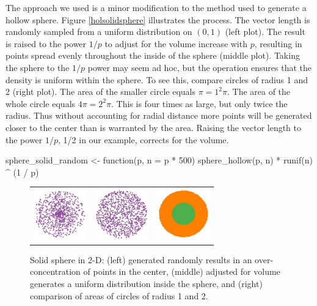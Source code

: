 The approach we used is a minor modification to the method used to
generate a hollow sphere. Figure \ref{holsolidsphere} illustrates the
process. The vector length is randomly sampled from a uniform
distribution on $(0,1)$ (left plot). The result is raised to the power
$1/p$ to adjust for the volume increase with $p$, resulting in points
spread evenly throughout the inside of the sphere (middle plot).
Taking the sphere to the $1/p$ power may seem ad hoc, but the
operation ensures that the density is uniform within the sphere. To see
this, compare circles of radius 1 and 2 (right plot).  The area of the
smaller circle equals $\pi =  1^2\pi $.  The area of the whole
circle equals $ 4 \pi = 2^2 \pi $. This is four times as large, but
only twice the radius.  Thus without accounting for radial distance
more points will be generated closer to the center than is warranted
by the area.  Raising the vector length to the power $1/p$, 1/2 in our
example, corrects for the volume.

\begin{example}
sphere_solid_random <- function(p, n = p * 500) {
  sphere_hollow(p, n) * runif(n) ^ (1 / p)
}
\end{example}

\begin{figure}[ht]
\centering
\begin{tabular}{c c c}
\includegraphics[width=0.9in]{fig/sphere-2-bad.jpg}
&\includegraphics[width=0.9in]{fig/sphere-2-good.jpg}
&\includegraphics[width=0.9in]{fig/sphere-2-1and2.jpg}
\end{tabular}
\caption{Solid sphere in 2-D: (left) generated randomly results in an
  over-concentration of points in the center, (middle) adjusted for
  volume generates a uniform distribution inside the sphere, and
  (right) comparison of areas of circles of radius 1 and 2.}
\label{cfb}
\end{figure}

